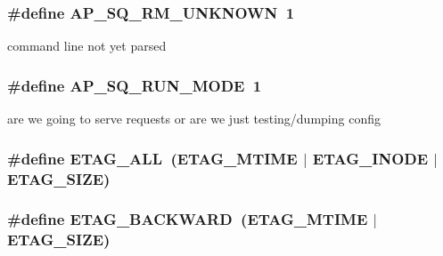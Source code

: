 \subsubsection[{\texorpdfstring{A\+P\+\_\+\+S\+Q\+\_\+\+R\+M\+\_\+\+U\+N\+K\+N\+O\+WN}{AP_SQ_RM_UNKNOWN}}]{\setlength{\rightskip}{0pt plus 5cm}\#define A\+P\+\_\+\+S\+Q\+\_\+\+R\+M\+\_\+\+U\+N\+K\+N\+O\+WN~1}\hypertarget{group__APACHE__CORE__HTTPD_gaaaf96a9ade9932c291e30cb28ef4c0aa}{}\label{group__APACHE__CORE__HTTPD_gaaaf96a9ade9932c291e30cb28ef4c0aa}
command line not yet parsed 
\subsubsection[{\texorpdfstring{A\+P\+\_\+\+S\+Q\+\_\+\+R\+U\+N\+\_\+\+M\+O\+DE}{AP_SQ_RUN_MODE}}]{\setlength{\rightskip}{0pt plus 5cm}\#define A\+P\+\_\+\+S\+Q\+\_\+\+R\+U\+N\+\_\+\+M\+O\+DE~1}\hypertarget{group__APACHE__CORE__HTTPD_ga6197969483fa993b55a33378088e47dd}{}\label{group__APACHE__CORE__HTTPD_ga6197969483fa993b55a33378088e47dd}
are we going to serve requests or are we just testing/dumping config 
\subsubsection[{\texorpdfstring{E\+T\+A\+G\+\_\+\+A\+LL}{ETAG_ALL}}]{\setlength{\rightskip}{0pt plus 5cm}\#define E\+T\+A\+G\+\_\+\+A\+LL~({\bf E\+T\+A\+G\+\_\+\+M\+T\+I\+ME} $\vert$ {\bf E\+T\+A\+G\+\_\+\+I\+N\+O\+DE} $\vert$ {\bf E\+T\+A\+G\+\_\+\+S\+I\+ZE})}\hypertarget{group__APACHE__CORE__HTTPD_gafba44e435239e8fe4f2ec000611f9e32}{}\label{group__APACHE__CORE__HTTPD_gafba44e435239e8fe4f2ec000611f9e32}
\subsubsection[{\texorpdfstring{E\+T\+A\+G\+\_\+\+B\+A\+C\+K\+W\+A\+RD}{ETAG_BACKWARD}}]{\setlength{\rightskip}{0pt plus 5cm}\#define E\+T\+A\+G\+\_\+\+B\+A\+C\+K\+W\+A\+RD~({\bf E\+T\+A\+G\+\_\+\+M\+T\+I\+ME} $\vert$ {\bf E\+T\+A\+G\+\_\+\+S\+I\+ZE})}\hypertarget{group__APACHE__CORE__HTTPD_ga0318e03c433a59eca2826a7548a843d9}{}\label{group__APACHE__CORE__HTTPD_ga0318e03c433a59eca2826a7548a843d9}
